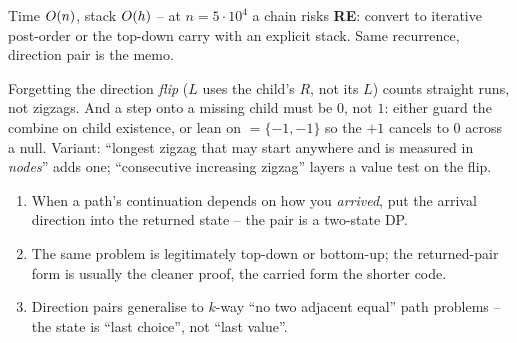 
\begin{complexitybox}
Time $O(n)$, stack $O(h)$ -- at $n = 5\cdot10^{4}$ a chain risks
\textbf{RE}: convert to iterative post-order or the top-down carry with an
explicit stack. Same recurrence, direction pair is the memo.
\end{complexitybox}

\begin{warningbox}
Forgetting the direction \emph{flip} ($L$ uses the child's $R$, not its $L$)
counts straight runs, not zigzags. And a step onto a missing child must be $0$,
not $1$: either guard the combine on child existence, or lean on
$=\{-1,-1\}$ so the $+1$ cancels to $0$ across a null. Variant: ``longest zigzag that may start anywhere and is
measured in \emph{nodes}'' adds one; ``consecutive increasing zigzag'' layers a
value test on the flip.
\end{warningbox}

\begin{insightbox}
\begin{enumerate}[nosep, leftmargin=1.6em]
  \item When a path's continuation depends on how you \emph{arrived}, put the
        arrival direction into the returned state -- the pair is a two-state DP.
  \item The same problem is legitimately top-down or bottom-up; the returned-pair
        form is usually the cleaner proof, the carried form the shorter code.
  \item Direction pairs generalise to $k$-way ``no two adjacent equal'' path
        problems -- the state is ``last choice'', not ``last value''.
\end{enumerate}
\end{insightbox}

